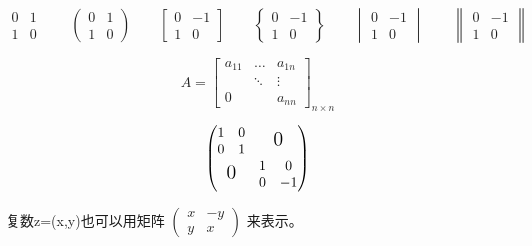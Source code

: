 \documentclass{ctexart}
\begin{document}
	\[				%
		\begin{matrix}		%
			0 & 1 \\
			1 & 0	
		\end{matrix}		%
		\qquad			%
		\begin{pmatrix}		%
			0 & 1 \\
			1 & 0	
		\end{pmatrix}		%
		\qquad
		\begin{bmatrix}		%
			0 & -1 \\
			1 & 0
		\end{bmatrix}
		\qquad
		\begin{Bmatrix}		%
			0 & -1 \\
			1 & 0
		\end{Bmatrix}
		\qquad
		\begin{vmatrix}		%
			0 & -1 \\
			1 & 0
		\end{vmatrix}
		\qquad
		\begin{Vmatrix}		%
			0 & -1 \\
			1 & 0
		\end{Vmatrix}
	\]			%

	\[
		A = \begin{bmatrix}	%
			a_{11} & \dots & a_{1n} \\
			 & \ddots & \vdots \\
			0 & & a_{nn}
		\end{bmatrix}_{n \times n}	%
	\]			
	
	\[
			\begin{pmatrix}
				\begin{matrix} 1 & 0 \\ 0 & 1 \end{matrix} & \text{\Large 0} \\
				\text{\Large 0} & \begin{matrix} 1 & 0 \\ 0 & -1 \end{matrix}
			\end{pmatrix}
	\]

	复数z=(x,y)也可以用矩阵
	\begin{math}
		\left(	%
			\begin{smallmatrix}
				x & -y \\ 
				y & x
			\end{smallmatrix}
		\right)
	\end{math}
	来表示。
\end{document}
